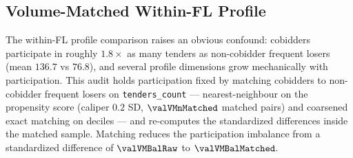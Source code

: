 \subsection{Volume-Matched Within-FL Profile}
\label{app:volume_matched_submission}

The within-FL profile comparison raises an obvious confound:
cobidders participate in roughly $1.8\times$ as many tenders as
non-cobidder frequent losers (mean $136.7$ vs $76.8$), and several
profile dimensions grow mechanically with participation. This audit
holds participation fixed by matching cobidders to non-cobidder
frequent losers on \texttt{tenders\_count} --- nearest-neighbour on
the propensity score (caliper $0.2$ SD, $\valVMnMatched$ matched
pairs) and coarsened exact matching on deciles --- and re-computes
the standardized differences inside the matched sample. Matching
reduces the participation imbalance from a standardized difference of
$\valVMBalRaw$ to $\valVMBalMatched$.

